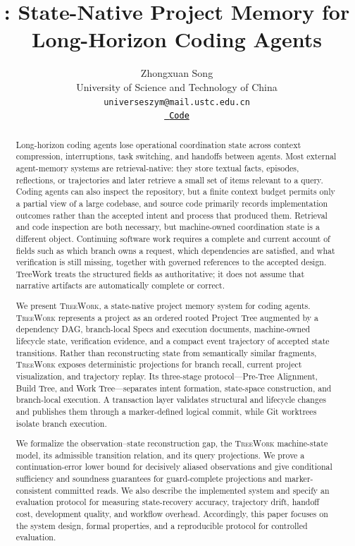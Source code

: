 \documentclass[11pt]{article}
\title{\system: State-Native Project Memory for Long-Horizon Coding Agents}
\author{Zhongxuan Song\\
\small University of Science and Technology of China\\
\texttt{universeszym@mail.ustc.edu.cn}\\
\small\href{https://github.com/Johnny-xuan/TreeWork}
{\textcolor{black}{\faGithub\ \texttt{Code}}}}
\date{}
\newcommand{\system}{\textsc{TreeWork}\xspace}
\theoremstyle{definition}
\begin{document}
\maketitle

\begin{abstract}
Long-horizon coding agents lose operational coordination state across context
compression, interruptions, task switching, and handoffs between agents.
Most external agent-memory systems are retrieval-native: they store textual
facts, episodes, reflections, or trajectories and later retrieve a small set of
items relevant to a query.  Coding agents can also inspect the repository, but
a finite context budget permits only a partial view of a large codebase, and
source code primarily records implementation outcomes rather than the accepted
intent and process that produced them.  Retrieval and code inspection are both
necessary, but machine-owned coordination state is a different object.
Continuing software work requires a complete and current account of fields such
as which branch owns a request, which dependencies are satisfied, and what
verification is still missing, together with governed references to the
accepted design.  TreeWork treats the structured fields as authoritative; it
does not assume that narrative artifacts are automatically complete or correct.

We present \system, a state-native project memory system for coding agents.
\system represents a project as an ordered rooted Project Tree augmented by a
dependency DAG, branch-local Specs and execution documents,
machine-owned lifecycle state, verification evidence, and a compact event
trajectory of accepted state transitions.  Rather than reconstructing state
from semantically similar fragments, \system exposes deterministic projections
for branch recall, current project visualization, and trajectory replay.  Its
three-stage protocol---Pre-Tree Alignment, Build Tree, and Work
Tree---separates intent formation, state-space construction, and branch-local
execution.  A transaction layer validates structural and lifecycle changes and
publishes them through a marker-defined logical commit, while Git worktrees
isolate branch execution.

We formalize the observation--state reconstruction gap, the \system machine-state
model, its admissible transition relation, and its query projections.  We prove
a continuation-error lower bound for decisively aliased observations and give
conditional sufficiency and soundness guarantees for guard-complete projections
and marker-consistent committed reads.  We also describe the implemented system and
specify an evaluation protocol for measuring state-recovery accuracy,
trajectory drift, handoff cost, development quality, and workflow overhead.
Accordingly, this paper focuses on the system design, formal properties, and a
reproducible protocol for controlled evaluation.
\end{abstract}
\end{document}
